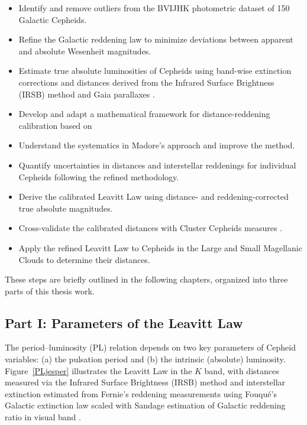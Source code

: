 \begin{itemize}
    \item Identify and remove outliers from the BVIJHK photometric dataset of 150 Galactic Cepheids.
    \item Refine the Galactic reddening law \citep{2007fouque} to minimize deviations between apparent and absolute Wesenheit magnitudes.
    \item Estimate true absolute luminosities of Cepheids using band-wise extinction corrections and distances derived from the Infrared Surface Brightness (IRSB) method \citep{2011storm} and Gaia parallaxes \citep{2023gaia}.
    \item Develop and adapt a mathematical framework for distance-reddening calibration based on \citep{2017madore} 
    \item Understand the systematics in Madore's approach and improve the method.
    \item Quantify uncertainties in distances and interstellar reddenings for individual Cepheids following the refined methodology.
    \item Derive the calibrated Leavitt Law using distance- and reddening-corrected true absolute magnitudes.
    \item Cross-validate the calibrated distances with Cluster Cepheids measures \citep{2023cruz}.
    \item Apply the refined Leavitt Law to Cepheids in the Large and Small Magellanic Clouds to determine their distances.
\end{itemize}

These steps are briefly outlined in the following chapters, organized into three parts of this thesis work. 

\subsection{Part I: Parameters of the Leavitt Law}
The period--luminosity (PL) relation depends on two key parameters of Cepheid variables: (a) the pulsation period and (b) the intrinsic (absolute) luminosity. Figure~\ref{PLjesper} illustrates the Leavitt Law in the $K$ band, with distances measured via the Infrared Surface Brightness (IRSB) method \citep{2011storm} and interstellar extinction estimated from Fernie's reddening measurements \citep{1994fernie} using Fouqué's Galactic extinction law \citep{2007fouque} scaled with Sandage estimation of Galactic reddening ratio in visual band \citep{2004sandage}.

